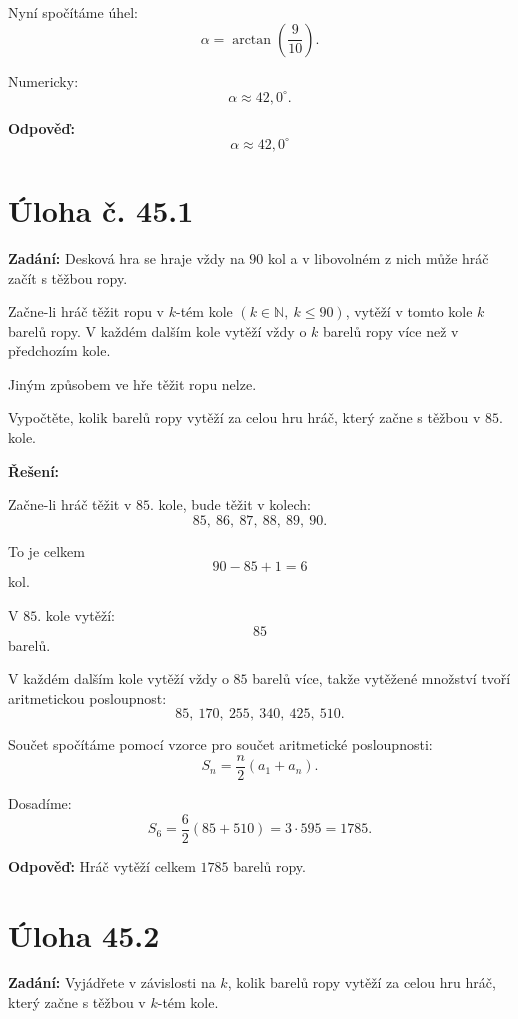 \documentclass[12pt,a4paper]{article}
\begin{document}
\medskip

Nyní spočítáme úhel:
\[
\alpha=\arctan\!\left(\frac{9}{10}\right).
\]

Numericky:
\[
\alpha \approx 42{,}0^\circ.
\]

\bigskip

\textbf{Odpověď:}
\[
\boxed{\alpha \approx 42{,}0^\circ}
\]



\newpage
\section*{Úloha č. 45.1}

\textbf{Zadání:}  
Desková hra se hraje vždy na \(90\) kol a v libovolném z nich může hráč začít s těžbou ropy.

Začne-li hráč těžit ropu v \(k\)-tém kole \((k\in\mathbb{N},\ k\le 90)\), vytěží v tomto kole \(k\) barelů ropy.  
V každém dalším kole vytěží vždy o \(k\) barelů ropy více než v předchozím kole.

Jiným způsobem ve hře těžit ropu nelze.

Vypočtěte, kolik barelů ropy vytěží za celou hru hráč, který začne s těžbou v \(85.\) kole.

\bigskip

\textbf{Řešení:}

Začne-li hráč těžit v \(85.\) kole, bude těžit v kolech:
\[
85,\ 86,\ 87,\ 88,\ 89,\ 90.
\]

To je celkem
\[
90-85+1=6
\]
kol.

V \(85.\) kole vytěží:
\[
85
\]
barelů.

V každém dalším kole vytěží vždy o \(85\) barelů více, takže vytěžené množství tvoří aritmetickou posloupnost:
\[
85,\ 170,\ 255,\ 340,\ 425,\ 510.
\]

Součet spočítáme pomocí vzorce pro součet aritmetické posloupnosti:
\[
S_n=\frac{n}{2}(a_1+a_n).
\]

Dosadíme:
\[
S_6=\frac{6}{2}(85+510)=3\cdot 595=1785.
\]

\bigskip

\textbf{Odpověď:}  
Hráč vytěží celkem \(1785\) barelů ropy.


\section*{Úloha 45.2}

\textbf{Zadání:}  
Vyjádřete v závislosti na \(k\), kolik barelů ropy vytěží za celou hru hráč, který začne s těžbou v \(k\)-tém kole.
\end{document}

